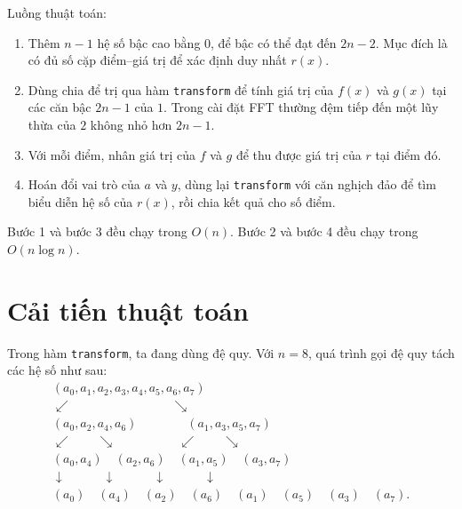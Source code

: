 \documentclass[11pt]{article}
\begin{document}
Luồng thuật toán:
\begin{enumerate}
  \item {} Thêm \(n-1\) hệ số bậc cao bằng \(0\), để bậc có
  thể đạt đến \(2n-2\). Mục đích là có đủ số cặp điểm--giá trị để xác định
  duy nhất \(r(x)\).
  \item {} Dùng chia để trị qua hàm \texttt{transform} để
  tính giá trị của \(f(x)\) và \(g(x)\) tại các căn bậc \(2n-1\) của \(1\).
  Trong cài đặt FFT thường đệm tiếp đến một lũy thừa của \(2\) không nhỏ hơn
  \(2n-1\).
  \item {} Với mỗi điểm, nhân giá trị của \(f\) và \(g\)
  để thu được giá trị của \(r\) tại điểm đó.
  \item {} Hoán đổi vai trò của \(a\) và \(y\), dùng lại
  \texttt{transform} với căn nghịch đảo để tìm biểu diễn hệ số của \(r(x)\),
  rồi chia kết quả cho số điểm.
\end{enumerate}

Bước 1 và bước 3 đều chạy trong \(O(n)\). Bước 2 và bước 4 đều chạy trong
\(O(n\log n)\).

\section{Cải tiến thuật toán}

Trong hàm \texttt{transform}, ta đang dùng đệ quy. Với \(n=8\), quá trình
gọi đệ quy tách các hệ số như sau:
\[
\begin{array}{c}
(a_0,a_1,a_2,a_3,a_4,a_5,a_6,a_7)\\[0.6em]
\swarrow\hspace{8em}\searrow\\[-0.2em]
(a_0,a_2,a_4,a_6)\hspace{4em}(a_1,a_3,a_5,a_7)\\[0.6em]
\swarrow\hspace{2em}\searrow\hspace{5em}\swarrow\hspace{2em}\searrow\\[-0.2em]
(a_0,a_4)\quad(a_2,a_6)\quad(a_1,a_5)\quad(a_3,a_7)\\[0.6em]
\downarrow\hspace{3em}\downarrow\hspace{3em}\downarrow\hspace{3em}\downarrow\\[-0.2em]
(a_0)\quad(a_4)\quad(a_2)\quad(a_6)\quad(a_1)\quad(a_5)\quad(a_3)\quad(a_7).
\end{array}
\]
\end{document}
